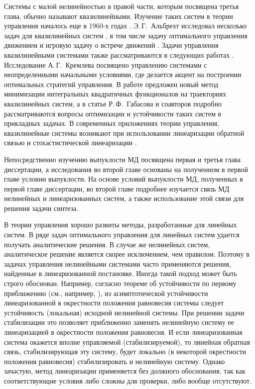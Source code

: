 \documentclass[../main.tex]{subfiles}
\begin{document}
Системы с малой нелинейностью в правой части, которым посвящена третья глава, обычно называют квазилинейными. 
Изучение таких систем в теории управления началось еще в 1960-х годах \cite{Subbotin, Kiselev, Kras_book}.
Э.\,Г.~Альбрехт исследовал несколько задач для квазилинейных систем \cite{Albrecht3}, в том числе задачу оптимального управления движением \cite{Albrecht1} и игровую задачу о встрече движений \cite{Albrecht2}.
Задачи управления квазилинейными системами также рассматриваются в следующих работах \cite{Dauer, Kremlev, KalininLavrinovich2018, Gabasov}.
Исследование А.\,Г.~Кремлева \cite{Kremlev} посвящено управлению системами с неопределенными начальными условиями, где делается акцент на построении оптимальных стратегий управления.
В работе \cite{KalininLavrinovich2018} предложен новый метод минимизации интегральных квадратичных функционалов на траекториях квазилинейных систем, а в статье Р.\,Ф.~Габасова и соавторов \cite{Gabasov} подробно рассматриваются вопросы оптимизации и устойчивости таких систем в прикладных задачах.
В современных приложениях теории управления, квазилинейные системы возникают при использовании линеаризации обратной связью и стохастистической линеаризации \cite{Ching, Gui}.

Непосредственно изучению выпуклости МД посвящена первая и третья глава диссертации, а исследования во второй главе основаны на полученном в первой главе условии выпуклости.
На основе условий выпуклости МД, полученных в первой главе диссертации, во второй главе подробнее изучается связь МД нелинейных и линеаризованных систем, а также использование этой связи для решения задачи синтеза. 

В теории управления хорошо развиты методы, разработанные для линейных систем. 
В ряде задач оптимального управления для линейных систем удается получать аналитические решения. 
В случае же нелинейных систем, аналитическое решение является скорее исключением, чем правилом. 
Поэтому в задачах управления нелинейными системами часто применяются решения, найденные в линеаризованной постановке. 
Иногда такой подход может быть строго обоснован. 
Например, согласно теореме об устойчивости по первому приближению (см., например, \cite{Barbashin_book}), из асимптотической устойчивости линеаризованной в окрестности положения равновесия системы следует устойчивость (локальная) исходной нелинейной системы. 
При решении задачи стабилизации это позволяет приближенно заменять нелинейную систему ее линеаризацией в окрестности положения равновесия. 
И если линеаризованная система окажется вполне управляемой (стабилизируемой), то линейная обратная связь, стабилизирующая эту систему, будет локально (в некоторой окрестности положения равновесия) стабилизировать и нелинейную систему\cite{Kras_add, Stab_lectures, Khalil, Polyak_book}.  
Однако зачастую, метод линеаризации применяется без должного обоснования, так как соответствующие условия либо сложны для проверки, либо вообще отсутствуют.
\end{document}
